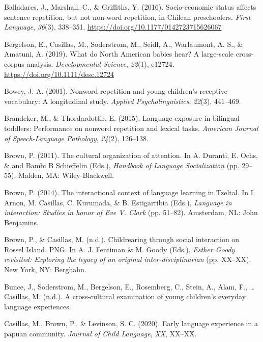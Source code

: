 \documentclass[english,,man,floatsintext]{apa6}
\begin{document}
\leavevmode\hypertarget{ref-balladares2016socio}{}%
Balladares, J., Marshall, C., \& Griffiths, Y. (2016). Socio-economic status affects sentence repetition, but not non-word repetition, in Chilean preschoolers. \emph{First Language}, \emph{36}(3), 338--351. \url{https://doi.org/10.1177/0142723715626067}

\leavevmode\hypertarget{ref-bergelsoncasillas2019what}{}%
Bergelson, E., Casillas, M., Soderstrom, M., Seidl, A., Warlaumont, A. S., \& Amatuni, A. (2019). What do North American babies hear? A large-scale cross-corpus analysis. \emph{Developmental Science}, \emph{22}(1), e12724. \url{https://doi.org/10.1111/desc.12724}

\leavevmode\hypertarget{ref-bowey2001nonword}{}%
Bowey, J. A. (2001). Nonword repetition and young children's receptive vocabulary: A longitudinal study. \emph{Applied Psycholinguistics}, \emph{22}(3), 441--469.

\leavevmode\hypertarget{ref-brandeker2015language}{}%
Brandeker, M., \& Thordardottir, E. (2015). Language exposure in bilingual toddlers: Performance on nonword repetition and lexical tasks. \emph{American Journal of Speech-Language Pathology}, \emph{24}(2), 126--138.

\leavevmode\hypertarget{ref-brown2011cultural}{}%
Brown, P. (2011). The cultural organization of attention. In A. Duranti, E. Ochs, \& and Bambi B Schieffelin (Eds.), \emph{Handbook of Language Socialization} (pp. 29--55). Malden, MA: Wiley-Blackwell.

\leavevmode\hypertarget{ref-brown2014interactional}{}%
Brown, P. (2014). The interactional context of language learning in Tzeltal. In I. Arnon, M. Casillas, C. Kurumada, \& B. Estigarribia (Eds.), \emph{Language in interaction: Studies in honor of Eve V. Clark} (pp. 51--82). Amsterdam, NL: John Benjamins.

\leavevmode\hypertarget{ref-brownIPchildrearing}{}%
Brown, P., \& Casillas, M. (n.d.). Childrearing through social interaction on Rossel Island, PNG. In A. J. Fentiman \& M. Goody (Eds.), \emph{Esther Goody revisited: Exploring the legacy of an original inter-disciplinarian} (pp. XX--XX). New York, NY: Berghahn.

\leavevmode\hypertarget{ref-bunceURcrosscultural}{}%
Bunce, J., Soderstrom, M., Bergelson, E., Rosemberg, C., Stein, A., Alam, F., \ldots{} Casillas, M. (n.d.). A cross-cultural examination of young children's everyday language experiences.

\leavevmode\hypertarget{ref-casillas2020early}{}%
Casillas, M., Brown, P., \& Levinson, S. C. (2020). Early language experience in a papuan community. \emph{Journal of Child Language}, \emph{XX}, XX--XX.
\end{document}
